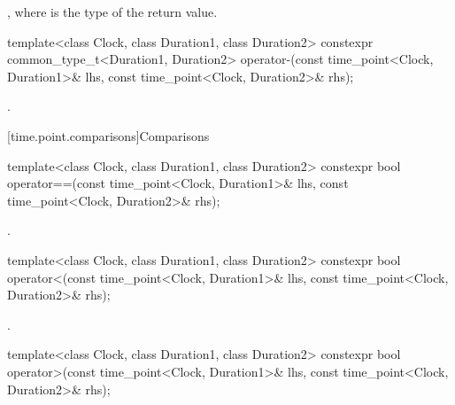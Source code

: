 \begin{itemdescr}
\pnum
\returns
{},
where  is the type of the return value.
\end{itemdescr}

%
\begin{itemdecl}
template<class Clock, class Duration1, class Duration2>
  constexpr common_type_t<Duration1, Duration2>
    operator-(const time_point<Clock, Duration1>& lhs, const time_point<Clock, Duration2>& rhs);
\end{itemdecl}

\begin{itemdescr}
\pnum
\returns
{}.
\end{itemdescr}

[time.point.comparisons]{Comparisons}

%
\begin{itemdecl}
template<class Clock, class Duration1, class Duration2>
  constexpr bool operator==(const time_point<Clock, Duration1>& lhs,
                            const time_point<Clock, Duration2>& rhs);
\end{itemdecl}

\begin{itemdescr}
\pnum
\returns
{}.
\end{itemdescr}

%
\begin{itemdecl}
template<class Clock, class Duration1, class Duration2>
  constexpr bool operator<(const time_point<Clock, Duration1>& lhs,
                           const time_point<Clock, Duration2>& rhs);
\end{itemdecl}

\begin{itemdescr}
\pnum
\returns
{}.
\end{itemdescr}

%
\begin{itemdecl}
template<class Clock, class Duration1, class Duration2>
  constexpr bool operator>(const time_point<Clock, Duration1>& lhs,
                           const time_point<Clock, Duration2>& rhs);
\end{itemdecl}

